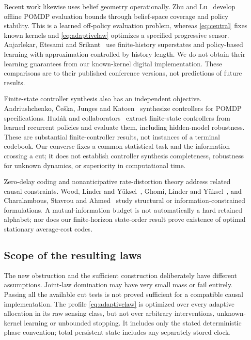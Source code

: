 Recent work likewise uses belief geometry operationally. Zhu and Lu~\cite{zhulu} develop offline POMDP evaluation bounds through belief-space coverage and policy stability. This is a learned off-policy evaluation problem, whereas \eqref{eq:central} fixes known kernels and \eqref{eq:adaptivelaw} optimizes a specified progressive sensor. Anjarlekar, Etesami and Srikant~\cite{anjarlekar} use finite-history superstates and policy-based learning with approximation controlled by history length. We do not obtain their learning guarantees from our known-kernel digital implementation. These comparisons are to their published conference versions, not predictions of future results.

Finite-state controller synthesis also has an independent objective. Andriushchenko, \v{C}e\v{s}ka, Junges and Katoen~\cite{inductive} synthesize controllers for POMDP specifications. Hud\'ak and collaborators~\cite{hudak} extract finite-state controllers from learned recurrent policies and evaluate them, including hidden-model robustness. These are substantial finite-controller results, not instances of a terminal codebook. Our converse fixes a common statistical task and the information crossing a cut; it does not establish controller synthesis completeness, robustness for unknown dynamics, or superiority in computational time.

Zero-delay coding and nonanticipative rate-distortion theory address related causal constraints. Wood, Linder and Y\"uksel~\cite{wood}, Ghomi, Linder and Y\"uksel~\cite{ghomi}, and Charalambous, Stavrou and Ahmed~\cite{nonanticipative} study structural or information-constrained formulations. A mutual-information budget is not automatically a hard retained alphabet; nor does our finite-horizon state-order result prove existence of optimal stationary average-cost codes.

\subsection{Scope of the resulting laws}
The new obstruction and the sufficient construction deliberately have different assumptions. Joint-law domination may have very small mass or fail entirely. Passing all the available cut tests is not proved sufficient for a compatible causal implementation. The profile \eqref{eq:adaptivelaw} is optimized over every adaptive allocation in its raw sensing class, but not over arbitrary interventions, unknown-kernel learning or unbounded stopping. It includes only the stated deterministic phase convention; total persistent state includes any separately stored clock.

